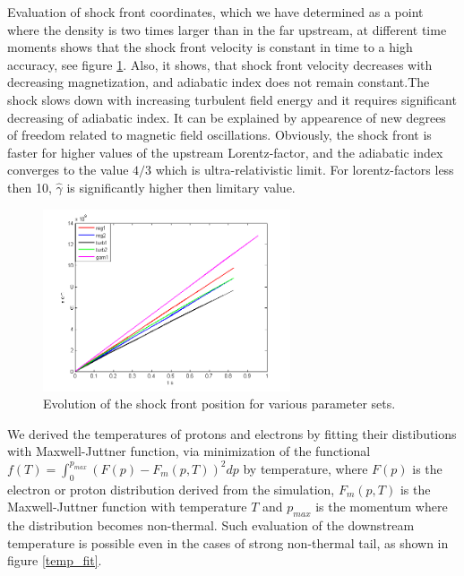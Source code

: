 \documentclass[a4paper]{jpconf}
\begin{document}
	Evaluation of shock front coordinates, which we have determined as a point where  the density is two times larger than in the far upstream, at different time moments shows that the shock front velocity is constant in time to a high accuracy, see figure \ref{shock_x}. Also, it shows, that shock front velocity decreases with decreasing magnetization, and adiabatic index does not remain constant.The shock slows down with increasing turbulent field energy and it requires significant decreasing of adiabatic index. It can be explained by appearence of new degrees of freedom related to magnetic field oscillations. Obviously, the shock front is faster for higher values of the upstream Lorentz-factor, and the adiabatic index  converges to the value $4/3$ which is ultra-relativistic limit. For lorentz-factors less then 10, $\hat{\gamma}$ is significantly higher then limitary value.
	
	
	\begin{figure}[h!]
		\centering
		\includegraphics[width=0.65\textwidth]{fig/shock_x.png} 
		\caption{Evolution of the shock front position for various parameter sets.}
		\label{shock_x}
	\end{figure}
	
	We derived the temperatures of protons and electrons by fitting their distibutions with Maxwell-Juttner function, via minimization of the functional $f(T) = \int_{0}^{p_{max}} (F(p) - F_{m}(p,T))^2dp$ by temperature, where $F(p)$ is the electron or proton distribution derived from the simulation, $F_{m}(p,T)$ is the Maxwell-Juttner function with temperature $T$ and $p_{max}$ is the momentum where the distribution becomes non-thermal. Such evaluation of the downstream temperature is possible even in the cases of strong non-thermal tail, as shown in figure \ref{temp_fit}.
	
\end{document}
